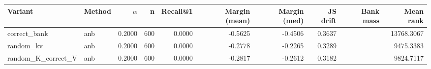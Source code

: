 \begin{tabular}{l l r r r r r r r r}
\toprule
Variant & Method & $\alpha$ & n & Recall@1 & Margin (mean) & Margin (med) & JS drift & Bank mass & Mean rank \\
\midrule
correct\_bank & anb & 0.2000 & 600 & 0.0000 & -0.5625 & -0.4506 & 0.3637 &  & 13768.3067 \\
random\_kv & anb & 0.2000 & 600 & 0.0000 & -0.2778 & -0.2265 & 0.3289 &  & 9475.3383 \\
random\_K\_correct\_V & anb & 0.2000 & 600 & 0.0000 & -0.2817 & -0.2612 & 0.3182 &  & 9824.7117 \\
\bottomrule
\end{tabular}
